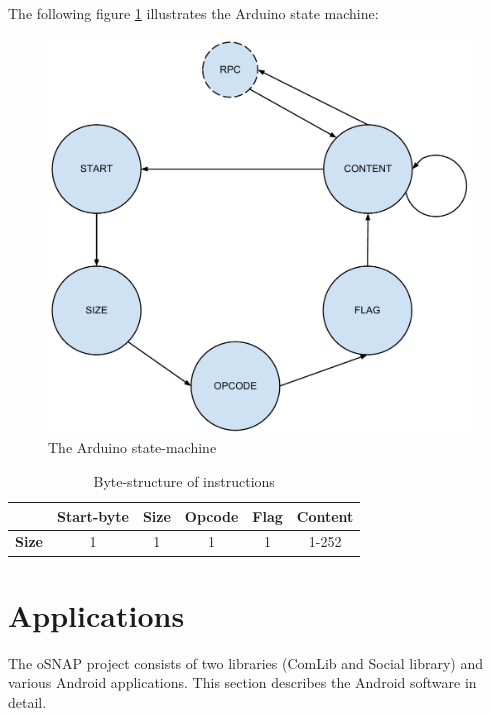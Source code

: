 The following figure \ref{fig:arduino_states} illustrates the Arduino state machine:

\begin{figure}[H]
	\centering
	\includegraphics[scale=0.5]{img/arduino_state-machine.pdf}
	\caption{The Arduino state-machine}
	\label{fig:arduino_states}
\end{figure}

\begin{table}[H]
	\begin{tabular}{c|c|c|c|c|c|}
		\cline{2-6}
		& \textbf{Start-byte} & \textbf{Size} & \textbf{Opcode} & \textbf{Flag} & \textbf{Content} \\
		\hline
		\multicolumn{1}{|c|}{\textbf{Size}} & 1 & 1 & 1 & 1 & 1-252 \\
		\hline
	\end{tabular}
	\caption{Byte-structure of instructions}
	\label{tbl:instr_struct}
\end{table}


\section{Applications}
The oSNAP project consists of two libraries (ComLib and Social library) and
various Android applications. This section describes the Android software in detail.

